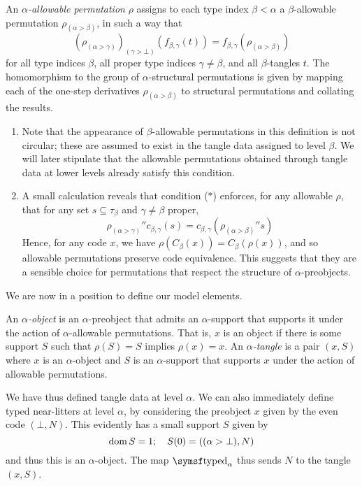 \begin{definition}
    An \emph{\( \alpha \)-allowable permutation} \( \rho \) assigns to each type index \( \beta < \alpha \) a \( \beta \)-allowable permutation \( \rho_{(\alpha > \beta)} \), in such a way that
    \begin{equation}
        (\rho_{(\alpha > \gamma)})_{(\gamma > \bot)}(f_{\beta,\gamma}(t)) = f_{\beta,\gamma}(\rho_{(\alpha > \beta)})
        \tag{\( \ast \)}
    \end{equation}
    for all type indices \( \beta \), all proper type indices \( \gamma \neq \beta \), and all \( \beta \)-tangles \( t \).
    The homomorphism to the group of \( \alpha \)-structural permutations is given by mapping each of the one-step derivatives \( \rho_{(\alpha > \beta)} \) to structural permutations and collating the results.
\end{definition}
\begin{remark}
    \begin{enumerate}
        \item Note that the appearance of \( \beta \)-allowable permutations in this definition is not circular; these are assumed to exist in the tangle data assigned to level \( \beta \).
        We will later stipulate that the allowable permutations obtained through tangle data at lower levels already satisfy this condition.
        \item A small calculation reveals that condition (\( \ast \)) enforces, for any allowable \( \rho \), that for any set \( s \subseteq \tau_\beta \) and \( \gamma \neq \beta \) proper, \[ {\rho_{(\alpha > \gamma)}} '' c_{\beta,\gamma}(s) = c_{\beta,\gamma}({\rho_{(\alpha > \beta)}} '' s) \]
        Hence, for any code \( x \), we have \( \rho(C_\beta(x)) = C_\beta(\rho(x)) \), and so allowable permutations preserve code equivalence.
        This suggests that they are a sensible choice for permutations that respect the structure of \( \alpha \)-preobjects.
    \end{enumerate}
\end{remark}

We are now in a position to define our model elements.

\begin{definition}
    An \emph{\( \alpha \)-object} is an \( \alpha \)-preobject that admits an \( \alpha \)-support that supports it under the action of \( \alpha \)-allowable permutations.
    That is, \( x \) is an object if there is some support \( S \) such that \( \rho(S) = S \) implies \( \rho(x) = x \).
    An \emph{\( \alpha \)-tangle} is a pair \( (x, S) \) where \( x \) is an \( \alpha \)-object and \( S \) is an \( \alpha \)-support that supports \( x \) under the action of allowable permutations.
\end{definition}

We have thus defined tangle data at level \( \alpha \).
We can also immediately define typed near-litters at level \( \alpha \), by considering the preobject \( x \) given by the even code \( (\bot, N) \).
This evidently has a small support \( S \) given by
\[ \operatorname{dom} S = 1;\quad S(0) = ((\alpha > \bot), N) \]
and thus this is an \( \alpha \)-object.
The map \( \typed_\alpha \) thus sends \( N \) to the tangle \( (x, S) \).
